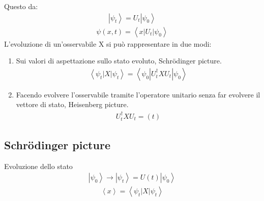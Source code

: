 Questo da:
\begin{equation}\begin{split}
\left |\psi _t \right\rangle=U_t\left |\psi _0 \right\rangle
\end{split}\end{equation}
\begin{equation}\begin{split}
\psi \left(x,t\right)=\left\langle x|U_t|\psi _0 \right\rangle
\end{split}\end{equation}
L'evoluzione di un'osservabile X si può rappresentare in due modi:
\begin{enumerate}
\item Sui valori di aspettazione sullo stato evoluto, Schrödinger picture.
\begin{equation}\begin{split}
\left\langle \psi _t|X|\psi _t \right\rangle=\left\langle \psi _0\left|U_t^\dag XU_t\right|\psi _0 \right\rangle
\end{split}\end{equation}
\item Facendo evolvere l'osservabile tramite l'operatore unitario senza far evolvere il vettore di stato, Heisenberg picture.
\begin{equation}\begin{split}
U_t^\dag XU_t=\left(t\right)
\end{split}\end{equation}
\end{enumerate}

\subsection{Schrödinger picture} %
Evoluzione dello stato
\begin{equation}\begin{split}
\left |\psi _0 \right\rangle \rightarrow \left |\psi _t \right\rangle=U\left(t\right)\left |\psi _0 \right\rangle
\end{split}\end{equation}
\begin{equation}\begin{split}
\left\langle x \right\rangle=\left\langle \psi _t|X|\psi _t \right\rangle
\end{split}\end{equation}

